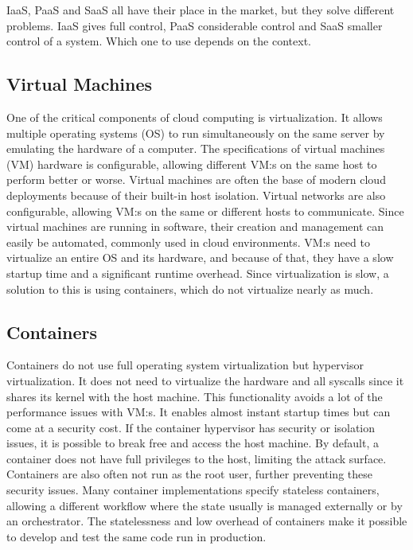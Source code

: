 IaaS, PaaS and SaaS all have their place in the market, but they solve different problems. IaaS gives full control, PaaS considerable control and SaaS smaller control of a system. Which one to use depends on the context. 
\subsection{Virtual Machines}
One of the critical components of cloud computing is virtualization. It allows multiple operating systems (OS) to run simultaneously on the same server by emulating the hardware of a computer\cite{vm_arch}. The specifications of virtual machines (VM) hardware is configurable, allowing different VM:s on the same host to perform better or worse. Virtual machines are often the base of modern cloud deployments because of their built-in host isolation. Virtual networks are also configurable, allowing VM:s on the same or different hosts to communicate. Since virtual machines are running in software, their creation and management can easily be automated, commonly used in cloud environments. VM:s need to virtualize an entire OS and its hardware, and because of that, they have a slow startup time and a significant runtime overhead. Since virtualization is slow, a solution to this is using containers, which do not virtualize nearly as much. 
\subsection{Containers}
Containers do not use full operating system virtualization but hypervisor virtualization\cite{what_containers}. It does not need to virtualize the hardware and all syscalls since it shares its kernel with the host machine. This functionality avoids a lot of the performance issues with VM:s. It enables almost instant startup times but can come at a security cost. If the container hypervisor has security or isolation issues, it is possible to break free and access the host machine. By default, a container does not have full privileges to the host, limiting the attack surface. Containers are also often not run as the root user, further preventing these security issues. Many container implementations specify stateless containers, allowing a different workflow where the state usually is managed externally or by an orchestrator. The statelessness and low overhead of containers make it possible to develop and test the same code run in production. 
